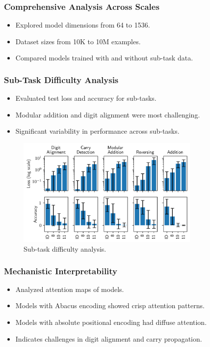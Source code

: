\documentclass[14pt,aspectratio=169]{beamer}
\theoremstyle{remark}
\begin{document}
\begin{frame}
    \frametitle{Comprehensive Analysis Across Scales}
    \begin{itemize}
        \item Explored model dimensions from 64 to 1536.
        \item Dataset sizes from 10K to 10M examples.
        \item Compared models trained with and without sub-task data.
    \end{itemize}
\end{frame}

\begin{frame}
    \frametitle{Sub-Task Difficulty Analysis}
    \begin{itemize}
        \item Evaluated test loss and accuracy for sub-tasks.
        \item Modular addition and digit alignment were most challenging.
        \item Significant variability in performance across sub-tasks.
    \end{itemize}
    \begin{figure}
        \centering
        \includegraphics[width=0.8\textwidth]{fig/subtask_difficulty.png}
        \caption{Sub-task difficulty analysis.}
    \end{figure}
\end{frame}

\begin{frame}
    \frametitle{Mechanistic Interpretability}
    \begin{itemize}
        \item Analyzed attention maps of models.
        \item Models with Abacus encoding showed crisp attention patterns.
        \item Models with absolute positional encoding had diffuse attention.
        \item Indicates challenges in digit alignment and carry propagation.
    \end{itemize}
\end{frame}
\end{document}
